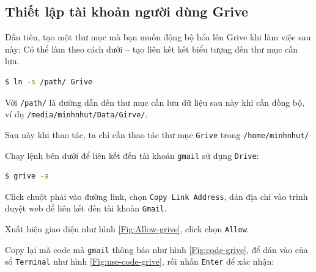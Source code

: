 \subsection{Thiết lập tài khoản người dùng Grive}\label{Sec:setting-grive}
\begin{list}{--}{}
\item Đầu tiên, tạo một thư mục mà bạn muốn động bộ hóa lên Grive khi làm việc sau này: Có thể làm theo cách dưới -- tạo liên kết kết biểu tượng đến thư mục cần lưu.
\begin{lstlisting}[language=bash]
$ ln -s /path/ Grive
\end{lstlisting}
\begin{list}{+}{}
\item Với \verb|/path/| là đường dẫn đến thư mục cần lưu dữ liệu sau này khi cần đồng bộ, ví dụ \verb|/media/minhnhut/Data/Girve/|. %
\item Sau này khi thao tác, ta chỉ cần thao tác thư mục \verb|Grive| trong \verb|/home/minhnhut/|
\end{list}
\item Chạy lệnh bên dưới để liên kết đến tài khoản \verb|gmail| sử dụng \verb|Drive|: 
\begin{lstlisting}[language=bash]
$ grive -a
\end{lstlisting}
\begin{list}{+}{}
\item Click chuột phải vào đường link, chọn \verb|Copy Link Address|, dán địa chỉ vào trình duyệt web để liên kết đến tài khoản \verb|Gmail|.
\item Xuất hiện giao diện như hình \ref{Fig:Allow-grive}, click chọn \verb|Allow|.
\item Copy lại mã code mà \verb|gmail| thông báo như hình \ref{Fig:code-grive}, để dán vào của sổ \verb|Terminal| như hình \ref{Fig:use-code-grive}, rồi nhấn \verb|Enter| để xác nhận:
\begin{figure}[!h]
\begin{center}

\end{center}
\end{figure}
\end{list}
\end{list}

